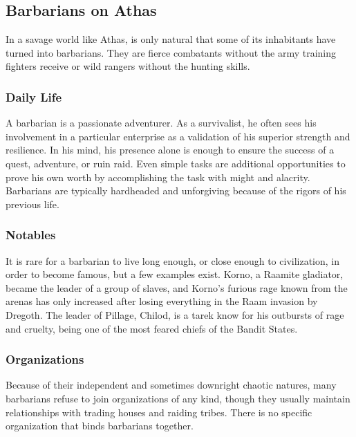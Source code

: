 






\subsection{Barbarians on Athas}

In a savage world like Athas, is only natural that some of its inhabitants have turned into barbarians. They are fierce combatants without the army training fighters receive or wild rangers without the hunting skills.

\subsubsection{Daily Life}
A barbarian is a passionate adventurer. As a survivalist, he often sees his involvement in a particular enterprise as a validation of his superior strength and resilience. In his mind, his presence alone is enough to ensure the success of a quest, adventure, or ruin raid. Even simple tasks are additional opportunities to prove his own worth by accomplishing the task with might and alacrity. Barbarians are typically hardheaded and unforgiving because of the rigors of his previous life.

\subsubsection{Notables}
It is rare for a barbarian to live long enough, or close enough to civilization, in order to become famous, but a few examples exist. Korno, a Raamite gladiator, became the leader of a group of slaves, and Korno's furious rage known from the arenas has only increased after losing everything in the Raam invasion by Dregoth. The leader of Pillage, Chilod, is a tarek know for his outbursts of rage and cruelty, being one of the most feared chiefs of the Bandit States.

\subsubsection{Organizations}
Because of their independent and sometimes downright chaotic natures, many barbarians refuse to join organizations of any kind, though they usually maintain relationships with trading houses and raiding tribes. There is no specific organization that binds barbarians together.

